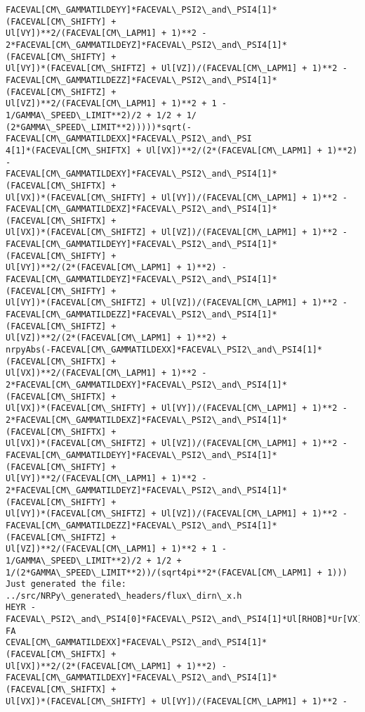 \documentclass[landscape,letterpaper,10pt,english]{article}
\begin{document}
\begin{Verbatim}[commandchars=\\\{\}]
FACEVAL[CM\_GAMMATILDEYY]*FACEVAL\_PSI2\_and\_PSI4[1]*(FACEVAL[CM\_SHIFTY] +
Ul[VY])**2/(FACEVAL[CM\_LAPM1] + 1)**2 -
2*FACEVAL[CM\_GAMMATILDEYZ]*FACEVAL\_PSI2\_and\_PSI4[1]*(FACEVAL[CM\_SHIFTY] +
Ul[VY])*(FACEVAL[CM\_SHIFTZ] + Ul[VZ])/(FACEVAL[CM\_LAPM1] + 1)**2 -
FACEVAL[CM\_GAMMATILDEZZ]*FACEVAL\_PSI2\_and\_PSI4[1]*(FACEVAL[CM\_SHIFTZ] +
Ul[VZ])**2/(FACEVAL[CM\_LAPM1] + 1)**2 + 1 - 1/GAMMA\_SPEED\_LIMIT**2)/2 + 1/2 + 1/
(2*GAMMA\_SPEED\_LIMIT**2)))))*sqrt(-FACEVAL[CM\_GAMMATILDEXX]*FACEVAL\_PSI2\_and\_PSI
4[1]*(FACEVAL[CM\_SHIFTX] + Ul[VX])**2/(2*(FACEVAL[CM\_LAPM1] + 1)**2) -
FACEVAL[CM\_GAMMATILDEXY]*FACEVAL\_PSI2\_and\_PSI4[1]*(FACEVAL[CM\_SHIFTX] +
Ul[VX])*(FACEVAL[CM\_SHIFTY] + Ul[VY])/(FACEVAL[CM\_LAPM1] + 1)**2 -
FACEVAL[CM\_GAMMATILDEXZ]*FACEVAL\_PSI2\_and\_PSI4[1]*(FACEVAL[CM\_SHIFTX] +
Ul[VX])*(FACEVAL[CM\_SHIFTZ] + Ul[VZ])/(FACEVAL[CM\_LAPM1] + 1)**2 -
FACEVAL[CM\_GAMMATILDEYY]*FACEVAL\_PSI2\_and\_PSI4[1]*(FACEVAL[CM\_SHIFTY] +
Ul[VY])**2/(2*(FACEVAL[CM\_LAPM1] + 1)**2) -
FACEVAL[CM\_GAMMATILDEYZ]*FACEVAL\_PSI2\_and\_PSI4[1]*(FACEVAL[CM\_SHIFTY] +
Ul[VY])*(FACEVAL[CM\_SHIFTZ] + Ul[VZ])/(FACEVAL[CM\_LAPM1] + 1)**2 -
FACEVAL[CM\_GAMMATILDEZZ]*FACEVAL\_PSI2\_and\_PSI4[1]*(FACEVAL[CM\_SHIFTZ] +
Ul[VZ])**2/(2*(FACEVAL[CM\_LAPM1] + 1)**2) +
nrpyAbs(-FACEVAL[CM\_GAMMATILDEXX]*FACEVAL\_PSI2\_and\_PSI4[1]*(FACEVAL[CM\_SHIFTX] +
Ul[VX])**2/(FACEVAL[CM\_LAPM1] + 1)**2 -
2*FACEVAL[CM\_GAMMATILDEXY]*FACEVAL\_PSI2\_and\_PSI4[1]*(FACEVAL[CM\_SHIFTX] +
Ul[VX])*(FACEVAL[CM\_SHIFTY] + Ul[VY])/(FACEVAL[CM\_LAPM1] + 1)**2 -
2*FACEVAL[CM\_GAMMATILDEXZ]*FACEVAL\_PSI2\_and\_PSI4[1]*(FACEVAL[CM\_SHIFTX] +
Ul[VX])*(FACEVAL[CM\_SHIFTZ] + Ul[VZ])/(FACEVAL[CM\_LAPM1] + 1)**2 -
FACEVAL[CM\_GAMMATILDEYY]*FACEVAL\_PSI2\_and\_PSI4[1]*(FACEVAL[CM\_SHIFTY] +
Ul[VY])**2/(FACEVAL[CM\_LAPM1] + 1)**2 -
2*FACEVAL[CM\_GAMMATILDEYZ]*FACEVAL\_PSI2\_and\_PSI4[1]*(FACEVAL[CM\_SHIFTY] +
Ul[VY])*(FACEVAL[CM\_SHIFTZ] + Ul[VZ])/(FACEVAL[CM\_LAPM1] + 1)**2 -
FACEVAL[CM\_GAMMATILDEZZ]*FACEVAL\_PSI2\_and\_PSI4[1]*(FACEVAL[CM\_SHIFTZ] +
Ul[VZ])**2/(FACEVAL[CM\_LAPM1] + 1)**2 + 1 - 1/GAMMA\_SPEED\_LIMIT**2)/2 + 1/2 +
1/(2*GAMMA\_SPEED\_LIMIT**2))/(sqrt4pi**2*(FACEVAL[CM\_LAPM1] + 1)))
Just generated the file: ../src/NRPy\_generated\_headers/flux\_dirn\_x.h
HEYR -FACEVAL\_PSI2\_and\_PSI4[0]*FACEVAL\_PSI2\_and\_PSI4[1]*Ul[RHOB]*Ur[VX]/sqrt(-FA
CEVAL[CM\_GAMMATILDEXX]*FACEVAL\_PSI2\_and\_PSI4[1]*(FACEVAL[CM\_SHIFTX] +
Ul[VX])**2/(2*(FACEVAL[CM\_LAPM1] + 1)**2) -
FACEVAL[CM\_GAMMATILDEXY]*FACEVAL\_PSI2\_and\_PSI4[1]*(FACEVAL[CM\_SHIFTX] +
Ul[VX])*(FACEVAL[CM\_SHIFTY] + Ul[VY])/(FACEVAL[CM\_LAPM1] + 1)**2 -

\end{Verbatim}
\end{document}
